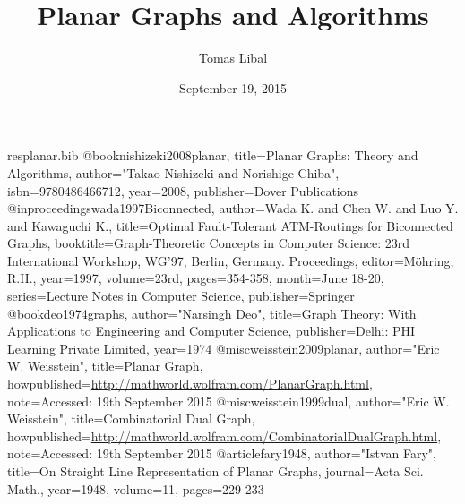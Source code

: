 \begin{filecontents*}{resplanar.bib}
@book{nishizeki2008planar,
    title={Planar Graphs: Theory and Algorithms},
    author="Takao {Nishizeki} and Norishige {Chiba}",
    isbn={9780486466712},
    year={2008},
    publisher={Dover Publications}
  }
  @inproceedings{wada1997Biconnected,
    author={Wada K. and Chen W. and Luo Y. and Kawaguchi K.},
    title={Optimal Fault-Tolerant ATM-Routings for Biconnected Graphs},
    booktitle={Graph-Theoretic Concepts in Computer Science: 23rd International Workshop, WG'97, Berlin, Germany. Proceedings},
    editor={M{\"o}hring, R.H.},
    year={1997},
    volume={23rd},
    pages={354-358},
    month={June 18-20},
    series={Lecture Notes in Computer Science},
    publisher={Springer}
  }
  @book{deo1974graphs,
    author="Narsingh {Deo}",
    title={Graph Theory: With Applications to Engineering and Computer Science},
    publisher={Delhi: PHI Learning Private Limited},
    year={1974}
  }
  @misc{weisstein2009planar,
    author="Eric W. {Weisstein}",
    title={Planar Graph},
    howpublished={\url{http://mathworld.wolfram.com/PlanarGraph.html}},
    note={Accessed: 19th September 2015}
  }
  @misc{weisstein1999dual,
    author="Eric W. {Weisstein}",
    title={Combinatorial Dual Graph},
    howpublished={\url{http://mathworld.wolfram.com/CombinatorialDualGraph.html}},
    note={Accessed: 19th September 2015}
  }
  @article{fary1948,
    author="Istvan {Fary}",
    title={On Straight Line Representation of Planar Graphs},
    journal={Acta Sci. Math.},
    year={1948},
    volume={11},
    pages={229-233}
    }
\end{filecontents*}

\documentclass[11pt]{article}

\usepackage{tikz}

\usepackage[backend=biber]{biblatex}


\title{Planar Graphs and Algorithms}
\author{Tomas Libal}
\date{September 19, 2015}



\maketitle

Planar graph is a graph that can be drawn geometrically on a plane without edge crossings (other than edge
crossings at the vertices). This is called \textit{embedding on a plane}~\autocite[90]{deo1974graphs}. Nishizeki
and Chiba~\autocite[11]{nishizeki2008planar} give a corollary which says that a planar graph has no vertex of
degree $ > 5 $.

